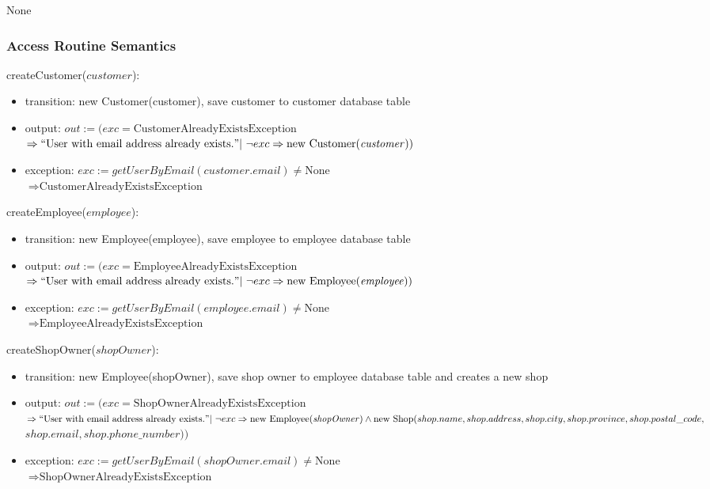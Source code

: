 \documentclass[12pt, titlepage]{article}
\begin{document}
None

\subsubsection{Access Routine Semantics}

\noindent createCustomer($customer$):
\begin{itemize}
	\item transition: new Customer(customer), save customer to customer database table
	\item output: $out := (exc = \text{CustomerAlreadyExistsException}$ \\ $\Rightarrow ``\text{User with
			      email address already exists.}" |\ \neg exc \Rightarrow \text{new Customer(\emph{customer})})$
	\item exception: $exc := getUserByEmail(customer.email) \neq \text{None}$ \\ $\Rightarrow
		      \text{CustomerAlreadyExistsException}$
\end{itemize}

\noindent createEmployee($employee$):
\begin{itemize}
	\item transition: new Employee(employee), save employee to employee database table
	\item output: $out := (exc = \text{EmployeeAlreadyExistsException}$ \\ $\Rightarrow ``\text{User with
			      email address already exists.}" |\ \neg exc \Rightarrow \text{new Employee(\emph{employee})})$
	\item exception: $exc := getUserByEmail(employee.email) \neq \text{None}$ \\ $\Rightarrow
		      \text{EmployeeAlreadyExistsException}$
\end{itemize}

\noindent createShopOwner($shopOwner$):
\begin{itemize}
	\item transition: new Employee(shopOwner), save shop owner to employee database table and creates a new
	      shop
	\item output: $out := (exc = \text{ShopOwnerAlreadyExistsException}$ \\ $\Rightarrow ``\text{User with
			      email address already exists.}" |\ \neg exc \Rightarrow \text{new Employee(\emph{shopOwner})} \land
		      \text{new Shop}(shop.name, shop.address, shop.city, shop.province, shop.postal\_code,$ \\ $
		      shop.email, shop.phone\_number))$
	\item exception: $exc := getUserByEmail(shopOwner.email) \neq \text{None}$ \\ $\Rightarrow
		      \text{ShopOwnerAlreadyExistsException}$
\end{itemize}
\end{document}

